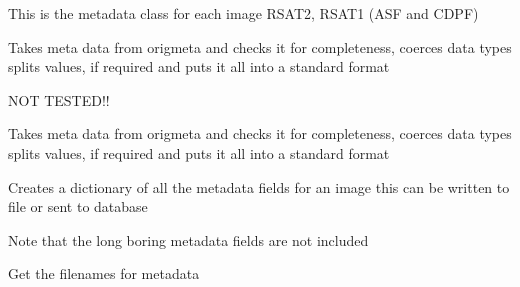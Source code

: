 \documentclass[letterpaper,10pt,english]{sphinxmanual}
\begin{document}
\begin{fulllineitems}
\label{code:Metadata.Metadata}
This is the metadata class for each image RSAT2, RSAT1 (ASF and CDPF)

\begin{fulllineitems}
\label{code:Metadata.Metadata.clean_metaASF}
Takes meta data from origmeta and checks it for completeness, coerces data types
splits values, if required and puts it all into a standard format

NOT TESTED!!

\end{fulllineitems}


\begin{fulllineitems}
\label{code:Metadata.Metadata.clean_metaCDPF}
Takes meta data from origmeta and checks it for completeness, coerces data types
splits values, if required and puts it all into a standard format

\end{fulllineitems}


\begin{fulllineitems}
\label{code:Metadata.Metadata.createMetaDict}
Creates a dictionary of all the metadata fields for an image
this can be written to file or sent to database

Note that the long boring metadata fields are not included

\end{fulllineitems}


\begin{fulllineitems}
\label{code:Metadata.Metadata.getCEOSmetafile}
Get the filenames for metadata

\end{fulllineitems}



\end{fulllineitems}
\end{document}
